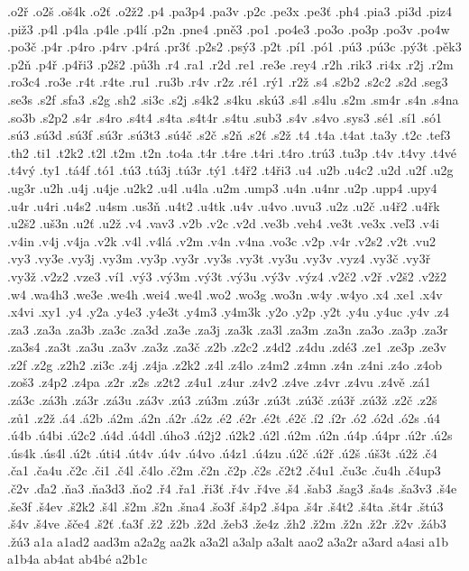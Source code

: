 .o2ř
.o2š
.oš4k
.o2ť
.o2ž2
.p4
.pa3p4
.pa3v
.p2c
.pe3x
.pe3ť
.ph4
.pia3
.pi3d
.piz4
.piž3
.p4l
.p4la
.p4le
.p4lí
.p2n
.pne4
.pně3
.po1
.po4e3
.po3o
.po3p
.po3v
.po4w
.po3č
.p4r
.p4ro
.p4rv
.p4rá
.pr3ť
.p2s2
.psý3
.p2t
.pí1
.pó1
.pú3
.pú3c
.pý3t
.pěk3
.p2ň
.p4ř
.p4ři3
.p2š2
.pů3h
.r4
.ra1
.r2d
.re1
.re3e
.rey4
.r2h
.rik3
.ri4x
.r2j
.r2m
.ro3c4
.ro3e
.r4t
.r4te
.ru1
.ru3b
.r4v
.r2z
.ré1
.rý1
.r2ž
.s4
.s2b2
.s2c2
.s2d
.seg3
.se3s
.s2f
.sfa3
.s2g
.sh2
.si3c
.s2j
.s4k2
.s4ku
.skú3
.s4l
.s4lu
.s2m
.sm4r
.s4n
.s4na
.so3b
.s2p2
.s4r
.s4ro
.s4t4
.s4ta
.s4t4r
.s4tu
.sub3
.s4v
.s4vo
.sys3
.sé1
.sí1
.só1
.sú3
.sú3d
.sú3f
.sú3r
.sú3t3
.sú4č
.s2č
.s2ň
.s2ť
.s2ž
.t4
.t4a
.t4at
.ta3y
.t2c
.tef3
.th2
.ti1
.t2k2
.t2l
.t2m
.t2n
.to4a
.t4r
.t4re
.t4ri
.t4ro
.trú3
.tu3p
.t4v
.t4vy
.t4vé
.t4vý
.ty1
.tá4f
.tó1
.tú3
.tú3j
.tú3r
.tý1
.t4ř2
.t4ři3
.u4
.u2b
.u4c2
.u2d
.u2f
.u2g
.ug3r
.u2h
.u4j
.u4je
.u2k2
.u4l
.u4la
.u2m
.ump3
.u4n
.u4nr
.u2p
.upp4
.upy4
.u4r
.u4ri
.u4s2
.u4sm
.us3ň
.u4t2
.u4tk
.u4v
.u4vo
.uvu3
.u2z
.u2č
.u4ř2
.u4řk
.u2š2
.uš3n
.u2ť
.u2ž
.v4
.vav3
.v2b
.v2c
.v2d
.ve3b
.veh4
.ve3t
.ve3x
.veľ3
.v4i
.v4in
.v4j
.v4ja
.v2k
.v4l
.v4lá
.v2m
.v4n
.v4na
.vo3c
.v2p
.v4r
.v2s2
.v2t
.vu2
.vy3
.vy3e
.vy3j
.vy3m
.vy3p
.vy3r
.vy3s
.vy3t
.vy3u
.vy3v
.vyz4
.vy3č
.vy3ř
.vy3ž
.v2z2
.vze3
.ví1
.vý3
.vý3m
.vý3t
.vý3u
.vý3v
.výz4
.v2č2
.v2ř
.v2š2
.v2ž2
.w4
.wa4h3
.we3e
.we4h
.wei4
.we4l
.wo2
.wo3g
.wo3n
.w4y
.w4yo
.x4
.xe1
.x4v
.x4vi
.xy1
.y4
.y2a
.y4e3
.y4e3t
.y4m3
.y4m3k
.y2o
.y2p
.y2t
.y4u
.y4uc
.y4v
.z4
.za3
.za3a
.za3b
.za3c
.za3d
.za3e
.za3j
.za3k
.za3l
.za3m
.za3n
.za3o
.za3p
.za3r
.za3s4
.za3t
.za3u
.za3v
.za3z
.za3č
.z2b
.z2c2
.z4d2
.z4du
.zdé3
.ze1
.ze3p
.ze3v
.z2f
.z2g
.z2h2
.zi3c
.z4j
.z4ja
.z2k2
.z4l
.z4lo
.z4m2
.z4mn
.z4n
.z4ni
.z4o
.z4ob
.zoš3
.z4p2
.z4pa
.z2r
.z2s
.z2t2
.z4u1
.z4ur
.z4v2
.z4ve
.z4vr
.z4vu
.z4vě
.zá1
.zá3c
.zá3h
.zá3r
.zá3u
.zá3v
.zú3
.zú3m
.zú3r
.zú3t
.zú3č
.zú3ř
.zú3ž
.z2č
.z2š
.zů1
.z2ž
.á4
.á2b
.á2m
.á2n
.á2r
.á2z
.é2
.é2r
.é2t
.é2č
.í2
.í2r
.ó2
.ó2d
.ó2s
.ú4
.ú4b
.ú4bi
.ú2c2
.ú4d
.ú4dl
.úho3
.ú2j2
.ú2k2
.ú2l
.ú2m
.ú2n
.ú4p
.ú4pr
.ú2r
.ú2s
.ús4k
.ús4l
.ú2t
.úti4
.út4v
.ú4v
.ú4vo
.ú4z1
.ú4zu
.ú2č
.ú2ř
.ú2š
.úš3t
.ú2ž
.č4
.ča1
.ča4u
.č2c
.či1
.č4l
.č4lo
.č2m
.č2n
.č2p
.č2s
.č2t2
.č4u1
.ču3c
.ču4h
.č4up3
.č2v
.ďa2
.ňa3
.ňa3d3
.ňo2
.ř4
.řa1
.ři3ť
.ř4v
.ř4ve
.š4
.šab3
.šag3
.ša4s
.ša3v3
.š4e
.še3f
.š4ev
.š2k2
.š4l
.š2m
.š2n
.šna4
.šo3f
.š4p2
.š4pa
.š4r
.š4t2
.š4ta
.št4r
.štú3
.š4v
.š4ve
.šče4
.š2ť
.ťa3f
.ž2
.ž2b
.ž2d
.žeb3
.že4z
.žh2
.ž2m
.ž2n
.ž2r
.ž2v
.žáb3
.žú3
a1a
a1ad2
aad3m
a2a2g
aa2k
a3a2l
a3alp
a3alt
aao2
a3a2r
a3ard
a4asi
a1b
a1b4a
ab4at
ab4bé
a2b1c

